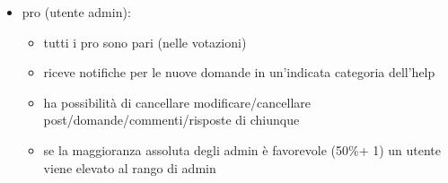 \documentclass{article}
\begin{document}
\begin{itemize}
    \item pro (utente admin):
    \begin{itemize}
      \item tutti i pro sono pari (nelle votazioni)
      \item riceve notifiche per le nuove domande in un'indicata categoria dell'help
      \item ha possibilità di cancellare modificare/cancellare post/domande/commenti/risposte di chiunque
      \item se la maggioranza assoluta degli admin è favorevole (50\%+ 1) un utente viene elevato al rango di admin
    \end{itemize}

  \end{itemize}




\end{document}
